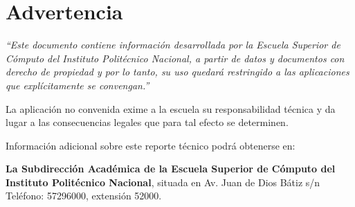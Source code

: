 \chapter*{Advertencia}

\begin{tcolorbox}[colframe=blue!50!black, colback=blue!5!white, title=]
	\begin{spacing}{1.2}
		\textit{“Este documento contiene información desarrollada por la Escuela Superior de Cómputo del Instituto Politécnico Nacional, a partir de datos y documentos con derecho de propiedad y por lo tanto, su uso quedará restringido a las aplicaciones que explícitamente se convengan.”}
		
		\bigskip
		
		La aplicación no convenida exime a la escuela su responsabilidad técnica y da lugar a las consecuencias legales que para tal efecto se determinen.
		
		\bigskip
		
		Información adicional sobre este reporte técnico podrá obtenerse en:
		
		\textbf{La Subdirección Académica de la Escuela Superior de Cómputo del Instituto Politécnico Nacional}, situada en Av. Juan de Dios Bátiz s/n Teléfono: 57296000, extensión 52000.
	\end{spacing}
\end{tcolorbox}
